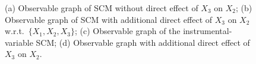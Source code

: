 \begin{figure}
\begin{center}
  \end{center}
  \caption{(a) Observable graph of SCM without direct effect of $X_3$ on $X_2$; (b) Observable graph of SCM with additional direct effect of $X_3$ on $X_2$ w.r.t.\ $\{X_1,X_2,X_3\}$; (c) Observable graph of the instrumental-variable SCM; (d) Observable graph with additional direct effect of $X_3$ on $X_2$.\label{fig:UCB_graphs}}
\end{figure}

